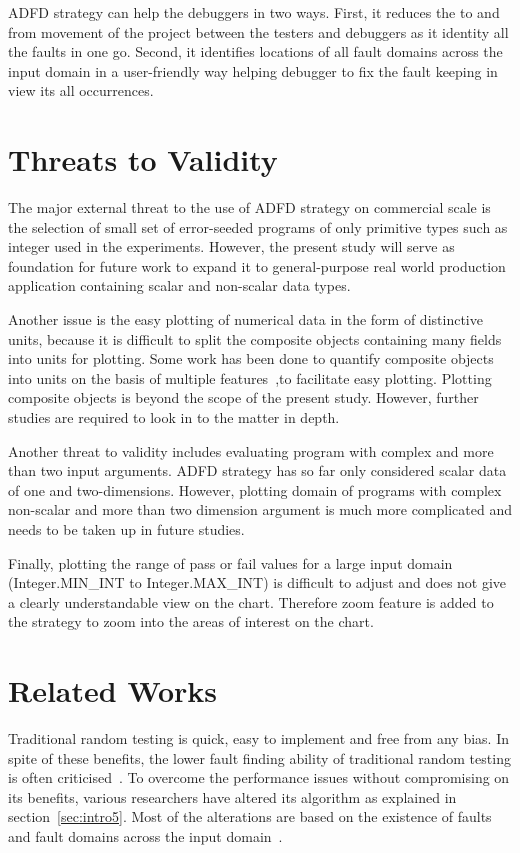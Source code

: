 ADFD strategy can help the debuggers in two ways. First, it reduces the to and from movement of the project between the testers and debuggers as it identity all the faults in one go. Second, it identifies locations of all fault domains across the input domain in a user-friendly way helping debugger to fix the fault keeping in view its all occurrences.


\section{Threats to Validity} \label{sec:validity}
The major external threat to the use of ADFD strategy on commercial scale is the selection of small set of error-seeded programs of only primitive types such as integer used in the experiments. However, the present study will serve as foundation for future work to expand it to general-purpose real world production application containing scalar and non-scalar data types.

Another issue is the easy plotting of numerical data in the form of distinctive units, because it is difficult to split the composite objects containing many fields into units for plotting. Some work has been done to quantify composite objects into units on the basis of multiple features~\cite{Ciupa2006},to facilitate easy plotting. Plotting composite objects is beyond the scope of the present study. However, further studies are required to look in to the matter in depth. 

Another threat to validity includes evaluating program with complex and more than two input arguments. ADFD strategy has so far only considered scalar data of one and two-dimensions. However, plotting domain of programs with complex non-scalar and more than two dimension argument is much more complicated and needs to be taken up in future studies.

Finally, plotting the range of pass or fail values for a large input domain (Integer.MIN\_INT to Integer.MAX\_INT) is difficult to adjust and does not give a clearly understandable view on the chart. Therefore zoom feature is added to the strategy to zoom into the areas of interest on the chart.



\section{Related Works} \label{sec:relatedWork}
Traditional random testing is quick, easy to implement and free from any bias. In spite of these benefits, the lower fault finding ability of traditional random testing is often criticised~\cite{Myers2011, Offutt1996}. To overcome the performance issues without compromising on its benefits, various researchers have altered its algorithm as explained in section~\ref{sec:intro5}. Most of the alterations are based on the existence of faults and fault domains across the input domain~\cite{Chan1996}. 

